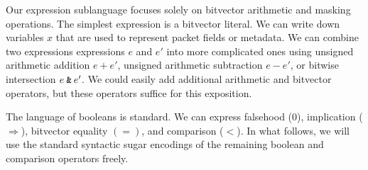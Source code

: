 Our expression sublanguage focuses solely on bitvector arithmetic and
masking operations. The simplest expression is a bitvector literal. We
can write down variables $x$ that are used to represent packet fields
or metadata. We can combine two expressions expressions $e$ and $e'$
into more complicated ones using unsigned arithmetic addition
$e + e'$, unsigned arithmetic subtraction $e - e'$, or bitwise
intersection $e \mathbin{\texttt{\&}} e'$. We could easily add additional arithmetic
and bitvector operators, but these operators suffice for this
exposition.

The language of booleans is standard. We can express falsehood ($0$),
implication ($\Rightarrow$), bitvector equality $(=)$, and comparison
($<$). In what follows, we will use the standard syntactic sugar
encodings of the remaining boolean and comparison operators freely.

